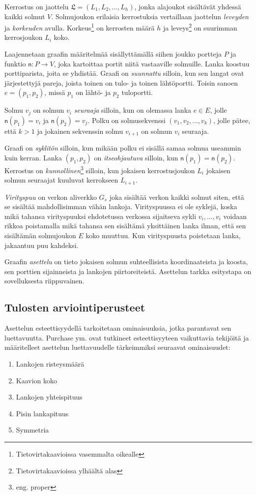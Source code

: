 \documentclass[finnish,12pt]{article}
\begin{document}
Kerrostus on jaottelu $\mathfrak{L} = (L_1, L_2, \dots, L_h)$, jonka alajoukot sisältävät yhdessä kaikki solmut $V$.
Solmujoukon erilaisia kerrostuksia vertaillaan jaottelun \emph{leveyden} ja \emph{korkeuden} avulla.
Korkeus\footnote{Tietovirtakaavioissa vasemmalta oikealle} on kerrosten määrä $h$ ja leveys\footnote{Tietovirtakaavioissa ylhäältä alas} on suurimman kerrosjoukon $L_i$ koko.

Laajennetaan graafin määritelmää sisällyttämällä siihen joukko portteja $P$ ja funktio $\mathsf{n} : P \rightarrow V$, joka kartoittaa portit niitä vastaaville solmuille.
Lanka koostuu porttiparista, joita se yhdistää. Graafi on \emph{suunnattu} silloin, kun sen langat ovat järjestettyjä pareja, joista toinen on tulo- ja toinen lähtöportti.
Toisin sanoen $e = (p_1, p_2)$, missä $p_1$ on lähtö- ja $p_2$ tuloportti.

Solmu $v_j$ on solmun $v_i$ \emph{seuraaja} silloin, kun on olemassa lanka $e \in E$, jolle $\mathsf{n}(p_1) = v_i$ ja $\mathsf{n}(p_2) = v_j$.
Polku on solmusekvenssi $(v_1, v_2, \dots , v_k)$, jolle pätee, että $k>1$ ja jokainen sekvenssin solmu $v_{i+1}$ on solmun $v_i$ seuraaja.

Graafi on \emph{syklitön} silloin, kun mikään polku ei sisällä samaa solmua useammin kuin kerran.
Lanka $(p_1, p_2)$ on \emph{itseohjautuva} silloin, kun $\mathsf{n}(p_1) = \mathsf{n}(p_2)$.
Kerrostus on \emph{kunnollinen}\footnote{eng. proper} silloin, kun jokaisen kerrostusjoukon $L_i$ jokaisen solmun seuraajat kuuluvat kerrokseen $L_{i+1}$.

\emph{Virityspuu} on verkon aliverkko $G_s$ joka sisältää verkon kaikki solmut siten, että se sisältää mahdollisimman vähän lankoja.
Virityspuussa ei ole syklejä, koska mikä tahansa virityspuuksi ehdotetussa verkossa sijaitseva sykli $v_i, ... , v_i$ voidaan rikkoa poistamalla mikä tahansa sen sisältämä yksittäinen lanka ilman, että sen sisältämän solmujoukon $E$ koko muuttuu.
Kun virityspuusta poistetaan lanka, jakaantuu puu kahdeksi.

Graafin \emph{asettelu} on tieto jokaisen solmun suhteellisista koordinaateista ja koosta, sen porttien sijainneista ja lankojen piirtoreiteistä. 
Asettelun tarkka esitystapa on sovelluksesta riippuvainen.

 		\subsection{Tulosten arviointiperusteet}

Asettelun esteettisyydellä tarkoitetaan ominaisuuksia, jotka parantavat sen luettavuutta.
Purchase ym. \cite{RefWorks:47} ovat tutkineet esteettisyyteen vaikuttavia tekijöitä ja määritelleet asettelun luettavuudelle tärkeimmiksi seuraavat ominaisuudet: 
\begin{enumerate}
  \item Lankojen risteysmäärä
  \item Kaavion koko
  \item Lankojen yhteispituus
  \item Pisin lankapituus
  \item Symmetria
\end{enumerate}
\end{document}
